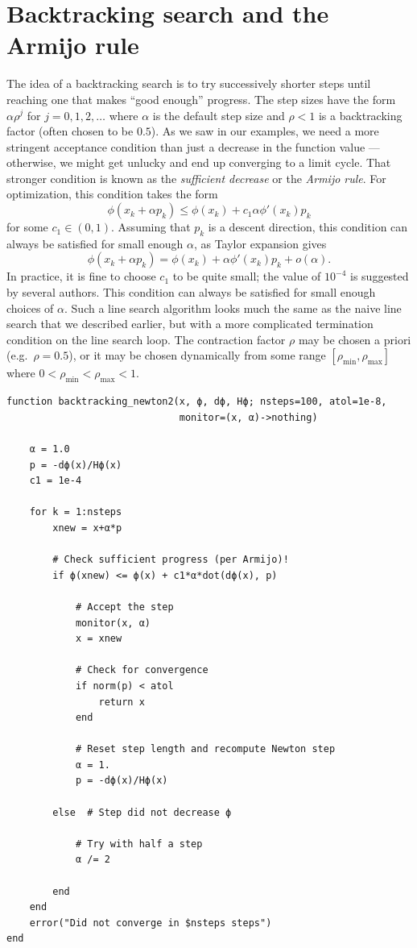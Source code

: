 \documentclass[12pt, leqno]{article} %
\begin{document}
\section{Backtracking search and the Armijo rule}

The idea of a backtracking search is to try successively shorter steps
until reaching one that makes ``good enough'' progress. The step sizes
have the form \(\alpha \rho^j\) for \(j = 0, 1, 2, \ldots\) where
\(\alpha\) is the default step size and \(\rho < 1\) is a backtracking
factor (often chosen to be \(0.5\)). As we saw in our examples, we need
a more stringent acceptance condition than just a decrease in the
function value --- otherwise, we might get unlucky and end up converging
to a limit cycle. That stronger condition is known as the
\emph{sufficient decrease} or the \emph{Armijo rule}. For optimization,
this condition takes the form
\[\phi(x_k + \alpha p_k) \leq \phi(x_k) + c_1 \alpha \phi'(x_k) p_k\]
for some \(c_1 \in (0,1)\). Assuming that \(p_k\) is a descent
direction, this condition can always be satisfied for small enough
\(\alpha\), as Taylor expansion gives
\[\phi(x_k + \alpha p_k) = \phi(x_k) + \alpha \phi'(x_k) p_k + o(\alpha).\]
In practice, it is fine to choose \(c_1\) to be quite small; the value
of \(10^{-4}\) is suggested by several authors. This condition can
always be satisfied for small enough choices of \(\alpha\). Such a line
search algorithm looks much the same as the naive line search that we
described earlier, but with a more complicated termination condition on
the line search loop. The contraction factor \(\rho\) may be chosen a
priori (e.g.~\(\rho = 0.5\)), or it may be chosen dynamically from some
range \([\rho_{\min}, \rho_{\max}]\) where
\(0 < \rho_{\min} < \rho_{\max} < 1\).

\begin{verbatim}
function backtracking_newton2(x, ϕ, dϕ, Hϕ; nsteps=100, atol=1e-8,
                              monitor=(x, α)->nothing)

    α = 1.0
    p = -dϕ(x)/Hϕ(x)
    c1 = 1e-4
    
    for k = 1:nsteps
        xnew = x+α*p
 
        # Check sufficient progress (per Armijo)!        
        if ϕ(xnew) <= ϕ(x) + c1*α*dot(dϕ(x), p)  

            # Accept the step
            monitor(x, α)
            x = xnew

            # Check for convergence
            if norm(p) < atol
                return x
            end
            
            # Reset step length and recompute Newton step
            α = 1.
            p = -dϕ(x)/Hϕ(x)

        else  # Step did not decrease ϕ

            # Try with half a step
            α /= 2

        end
    end
    error("Did not converge in $nsteps steps")
end
\end{verbatim}
\end{document}
